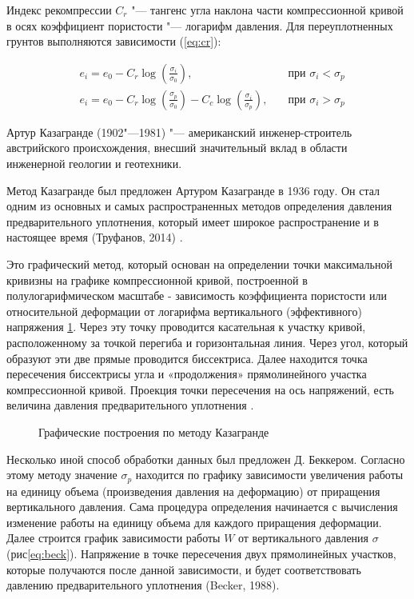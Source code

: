  Индекс рекомпрессии $C_r$ "--- тангенс угла наклона части компрессионной кривой в осях коэффициент пористости "--- логарифм давления. Для переуплотненных грунтов выполняются зависимости (\ref{eq:cr}):

\begin{equation}
  \label{eq:cr}
  \begin{alignedat}{2}
  & e_i = e_0 - C_r\log \left(\frac{\sigma_i}{\sigma_0}\right), \quad &\text{при } \sigma_i<\sigma_p \\
  & e_i = e_0 - C_r\log \left(\frac{\sigma_p}{\sigma_0}\right) - C_c\log \left(\frac{\sigma_i}{\sigma_p}\right), \quad &\text{при } \sigma_i>\sigma_p
  \end{alignedat}
\end{equation}


 
 Артур Казагранде (1902"---1981) "--- американский инженер-строитель австрийского происхождения, внесший значительный вклад в области инженерной геологии и геотехники. 
 
 Метод Казагранде был предложен Артуром Казагранде в 1936 году.
 Он стал одним из основных и самых распространенных методов определения давления предварительного уплотнения, который имеет широкое распространение и в настоящее время (Труфанов, 2014) \cite{truf2014}.
 
    

 Это графический метод, который основан на определении точки максимальной кривизны на графике компрессионной кривой, построенной в полулогарифмическом масштабе - зависимость коэффициента пористости или относительной деформации от логарифма вертикального (эффективного) напряжения \ref{eq:caz}. 
 Через эту точку проводится касательная к участку кривой, расположенному за точкой перегиба и горизонтальная линия. 
 Через угол, который образуют эти две прямые проводится биссектриса. 
 Далее находится точка пересечения биссектрисы угла и «продолжения» прямолинейного участка компрессионной кривой. Проекция точки пересечения на ось напряжений, есть величина давления предварительного уплотнения . 

 \begin{figure}[ht]
  \centering
  \label{eq:caz}
  
  \caption{Графические построения по методу Казагранде}
\end{figure}
 
Несколько иной способ обработки данных был предложен Д. Беккером. 
Согласно этому методу значение $\sigma_p$ находится по графику зависимости увеличения работы на единицу объема (произведения давления на деформацию) от приращения вертикального давления. 
Сама процедура определения начинается с вычисления изменение работы на единицу объема для каждого приращения деформации. 
Далее строится график зависимости работы $W$ от вертикального давления $\sigma$ (рис\ref{eq:beck}). 
Напряжение в точке пересечения двух прямолинейных участков, которые получаются после данной зависимости, и будет соответствовать давлению предварительного уплотнения (Becker, 1988)\cite{becker1988}.


